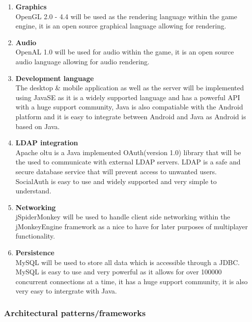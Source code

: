 \documentclass[letterpaper]{article}
\begin{document}
				\begin{enumerate}					
					\item \textbf{Graphics}
					\\OpenGL 2.0 - 4.4 will be used as the rendering language within the game engine, it is an open source graphical language allowing for rendering.
					
					\item \textbf{Audio}
					\\OpenAL 1.0 will be used for audio within the game, it is an open source audio language allowing for audio rendering.
					
					\item \textbf{Development language}
					\\The desktop \& mobile application as well as the server will be implemented using JavaSE as it is a widely supported language and has a powerful API with a huge support community, Java is also compatiable with the Android platform and it is easy to integrate between Android and Java as Android is based on Java.
					
					\item \textbf{LDAP integration}
					\\Apache oltu is a Java implemented OAuth(version 1.0) library that will be the used to communicate with external LDAP servers. LDAP is a safe and secure database service that will prevent access to unwanted users. SocialAuth is easy to use and widely supported and very simple to understand.
					
					\item \textbf{Networking}
					\\jSpiderMonkey will be used to handle client side networking within the jMonkeyEngine framework as a nice to have for later purposes of multiplayer functionality.
					
					\item \textbf{Persistence}
					\\MySQL will be used to store all data which is accessible through a JDBC. MySQL is easy to use and very powerful as it allows for over 100000 concurrent connections at a time, it has a huge support community, it is also very easy to intergrate with Java.
				\end{enumerate}
				
			\subsubsection*{Architectural patterns/frameworks}
			\vspace{0.1in}
			
\end{document}

